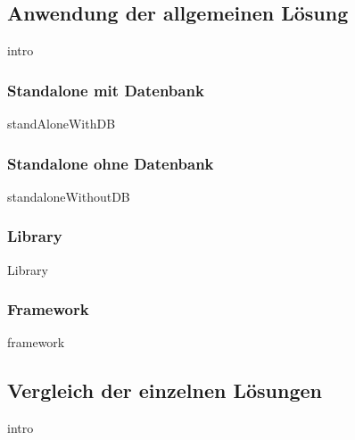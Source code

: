 \documentclass{article}
\begin{document}
    \newpage
    \subsection{Anwendung der allgemeinen Lösung}
        {intro}
        
        \newpage
        \subsubsection{Standalone mit Datenbank}
            {standAloneWithDB}

        \newpage
        \subsubsection{Standalone ohne Datenbank}
            {standaloneWithoutDB}

        \newpage
        \subsubsection{Library}
            {Library}
        
        \newpage
        \subsubsection{Framework}
            {framework}
    
    \newpage
    \subsection{Vergleich der einzelnen Lösungen}
        {intro}




\newpage
\printbibliography[heading = bibintoc, title = Bibliography]    %

\end{document}

